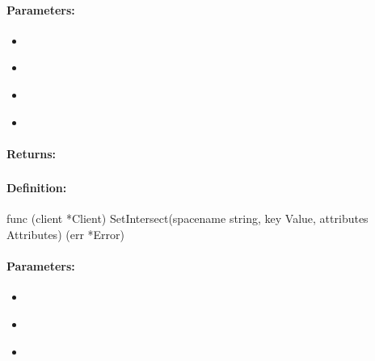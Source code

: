 \paragraph{Parameters:}
\begin{itemize}[noitemsep]
\item {}\\

\item {}\\

\item {}\\

\item {}\\

\end{itemize}

\paragraph{Returns:}


\pagebreak
\subsubsection{}
\label{api:Go:SetIntersect}


\paragraph{Definition:}
\begin{gocode}
func (client *Client) SetIntersect(spacename string, key Value, attributes Attributes) (err *Error)
\end{gocode}

\paragraph{Parameters:}
\begin{itemize}[noitemsep]
\item {}\\

\item {}\\

\item {}\\

\end{itemize}


